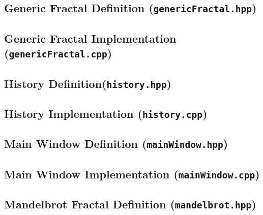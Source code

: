 \pagebreak

\subsection{Generic Fractal Definition (\texttt{genericFractal.hpp})}


\pagebreak

\subsection{Generic Fractal Implementation (\texttt{genericFractal.cpp})}


\pagebreak

\subsection{History Definition(\texttt{history.hpp})}


\pagebreak

\subsection{History Implementation (\texttt{history.cpp})}


\pagebreak

\subsection{Main Window Definition (\texttt{mainWindow.hpp})}


\pagebreak

\subsection{Main Window Implementation (\texttt{mainWindow.cpp})}


\pagebreak

\subsection{Mandelbrot Fractal Definition (\texttt{mandelbrot.hpp})}


